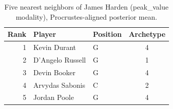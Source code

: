 \begin{table}[htbp]
  \centering\small
  \begin{tabular}{rllc}
    \toprule
    Rank & Player & Position & Archetype \\
    \midrule
    1 & Kevin Durant & G & 4 \\
    2 & D'Angelo Russell & G & 1 \\
    3 & Devin Booker & G & 4 \\
    4 & Arvydas Sabonis & C & 2 \\
    5 & Jordan Poole & G & 4 \\
    \bottomrule
  \end{tabular}
  \caption{Five nearest neighbors of James Harden (peak_value modality), Procrustes-aligned posterior mean.}
  \label{tab:James_Harden_neighbors_peak_value}
\end{table}

